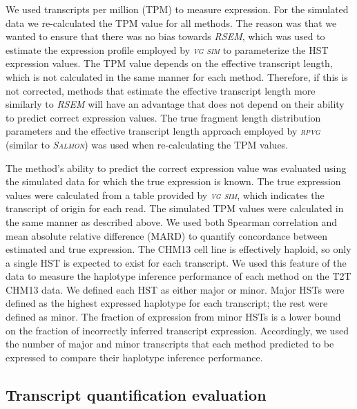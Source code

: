 \documentclass[11pt]{ucthesis}
\newcommand{\tool}[1]{\emph{\textsc{#1}}}
\begin{document}
We used transcripts per million (TPM) to measure expression. For the simulated data we re-calculated the TPM value for all methods. The reason was that we wanted to ensure that there was no bias towards \tool{RSEM}, which was used to estimate the expression profile employed by \tool{vg sim} to parameterize the HST expression values. The TPM value depends on the effective transcript length, which is not calculated in the same manner for each method. Therefore, if this is not corrected, methods that estimate the effective transcript length more similarly to \tool{RSEM} will have an advantage that does not depend on their ability to predict correct expression values. The true fragment length distribution parameters and the effective transcript length approach employed by \tool{rpvg} (similar to \tool{Salmon}) was used when re-calculating the TPM values.

The method's ability to predict the correct expression value was evaluated using the simulated data for which the true expression is known. The true expression values were calculated from a table provided by \tool{vg sim}, which indicates the transcript of origin for each read. The simulated TPM values were calculated in the same manner as described above. We used both Spearman correlation and mean absolute relative difference (MARD) to quantify concordance between estimated and true expression. 
\newline 
\newline
The CHM13 cell line is effectively haploid, so only a single HST is expected to exist for each transcript. We used this feature of the data to measure the haplotype inference performance of each method on the T2T CHM13 data. We defined each HST as either major or minor. Major HSTs were defined as the highest expressed haplotype for each transcript; the rest were defined as minor. The fraction of expression from minor HSTs is a lower bound on the fraction of incorrectly inferred transcript expression. Accordingly, we used the number of major and minor transcripts that each method predicted to be expressed to compare their haplotype inference performance.

\subsection{Transcript quantification evaluation}
\end{document}
